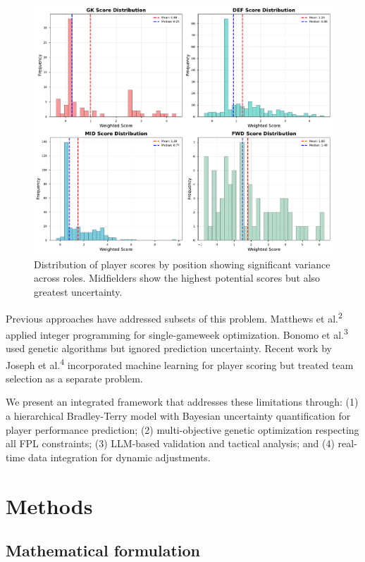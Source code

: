\documentclass[10pt,a4paper,twocolumn]{article}
\begin{document}
\begin{figure}[h]
\centering
\includegraphics[width=\columnwidth]{figures/player_score_distribution.pdf}
\caption{Distribution of player scores by position showing significant variance across roles. Midfielders show the highest potential scores but also greatest uncertainty.}
\label{fig:player_distribution}
\end{figure}

Previous approaches have addressed subsets of this problem. Matthews et al.\textsuperscript{2} applied integer programming for single-gameweek optimization. Bonomo et al.\textsuperscript{3} used genetic algorithms but ignored prediction uncertainty. Recent work by Joseph et al.\textsuperscript{4} incorporated machine learning for player scoring but treated team selection as a separate problem.

We present an integrated framework that addresses these limitations through: (1) a hierarchical Bradley-Terry model with Bayesian uncertainty quantification for player performance prediction; (2) multi-objective genetic optimization respecting all FPL constraints; (3) LLM-based validation and tactical analysis; and (4) real-time data integration for dynamic adjustments.

\section*{Methods}

\subsection*{Mathematical formulation}
\end{document}
